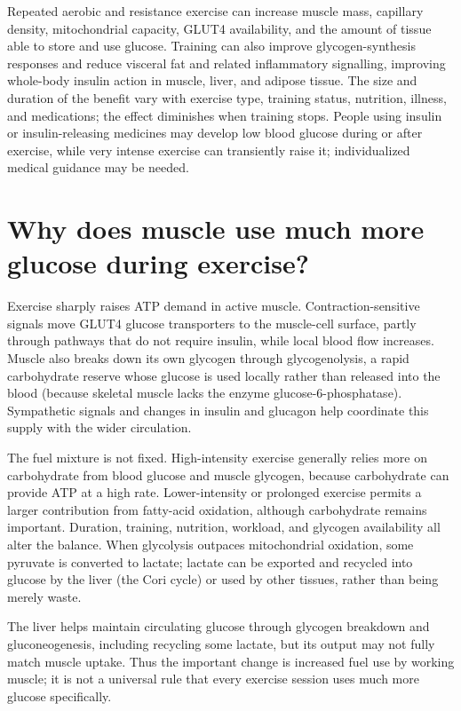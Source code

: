 \documentclass[11pt,oneside]{report}
\begin{document}
Repeated aerobic and resistance exercise can increase muscle mass, capillary
density, mitochondrial capacity, GLUT4 availability, and the amount of tissue
able to store and use glucose. Training can also improve glycogen-synthesis
responses and reduce visceral fat and related inflammatory signalling, improving
whole-body insulin action in muscle, liver, and adipose tissue. The size and
duration of the benefit vary with exercise type, training status, nutrition,
illness, and medications; the effect diminishes when training stops. People
using insulin or insulin-releasing medicines may develop low blood glucose
during or after exercise, while very intense exercise can transiently raise it;
individualized medical guidance may be needed.

\section{Why does muscle use much more glucose during exercise?}

Exercise sharply raises ATP demand in active muscle. Contraction-sensitive
signals move GLUT4 glucose transporters to the muscle-cell surface, partly
through pathways that do not require insulin, while local blood flow increases.
Muscle also breaks down its own glycogen through glycogenolysis, a rapid
carbohydrate reserve whose glucose is used locally rather than released into
the blood (because skeletal muscle lacks the enzyme glucose-6-phosphatase).
Sympathetic signals and changes in insulin and glucagon help
coordinate this supply with the wider circulation.

The fuel mixture is not fixed. High-intensity exercise generally relies more on
carbohydrate from blood glucose and muscle glycogen, because carbohydrate can
provide ATP at a high rate. Lower-intensity or prolonged exercise permits a
larger contribution from fatty-acid oxidation, although carbohydrate remains
important. Duration, training, nutrition, workload, and glycogen availability
all alter the balance. When glycolysis outpaces mitochondrial oxidation, some
pyruvate is converted to lactate; lactate can be exported and recycled into
glucose by the liver (the Cori cycle) or used by other tissues, rather than
being merely waste.

The liver helps maintain circulating glucose through glycogen breakdown and
gluconeogenesis, including recycling some lactate, but its output may not fully
match muscle uptake. Thus the important change is increased fuel use by working
muscle; it is not a universal rule that every exercise session uses much more
glucose specifically.
\end{document}
